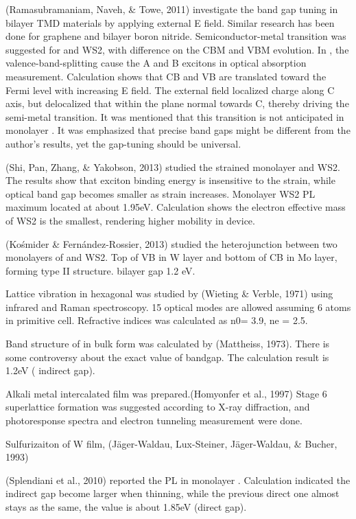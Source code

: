 (Ramasubramaniam, Naveh, \& Towe, 2011) investigate the band gap tuning in bilayer TMD materials by applying external E field. Similar research has been done for graphene and bilayer boron nitride. Semiconductor-metal transition was suggested for  and WS2, with difference on the CBM and VBM evolution. In , the valence-band-splitting cause the A and B excitons in optical absorption measurement. Calculation shows that CB and VB are translated toward the Fermi level with increasing E field.  The external field localized charge along C axis, but delocalized that within the plane normal towards C, thereby driving the semi-metal transition. It was mentioned that this transition is not anticipated in monolayer . It was emphasized that precise band gaps might be different from the author’s results, yet the gap-tuning should be universal.

(Shi, Pan, Zhang, \& Yakobson, 2013) studied the strained monolayer  and WS2. The results show that exciton binding energy is insensitive to the strain, while optical band gap becomes smaller as strain increases. Monolayer WS2 PL maximum located at about 1.95eV. Calculation shows the electron effective mass of WS2 is the smallest, rendering higher mobility in device.

(Kośmider \& Fernández-Rossier, 2013) studied the heterojunction between two monolayers of  and WS2. Top of VB in W layer and bottom of CB in Mo layer, forming type II structure. bilayer gap 1.2 eV.


Lattice vibration in hexagonal  was studied by (Wieting & Verble, 1971) using infrared and Raman spectroscopy. 15 optical modes are allowed assuming 6 atoms in primitive cell. Refractive indices was calculated as n0= 3.9, ne = 2.5. \cite{Wieting1971}

Band structure  of  in bulk form was calculated by (Mattheiss, 1973). There is some controversy about the exact value of bandgap. The calculation result is 1.2eV ( indirect gap).\cite{Mattheiss1973}

Alkali metal intercalated  film was prepared.(Homyonfer et al., 1997) Stage 6 superlattice formation was suggested according to X-ray diffraction, and photoresponse spectra and electron tunneling measurement were done.

Sulfurizaiton of W film, (Jäger-Waldau, Lux-Steiner, Jäger-Waldau, & Bucher, 1993)

(Splendiani et al., 2010) reported the PL in monolayer .  Calculation indicated the indirect gap become larger when thinning, while the previous direct one almost stays as the same, the value is about 1.85eV (direct gap).\cite{Splendiani2010}

